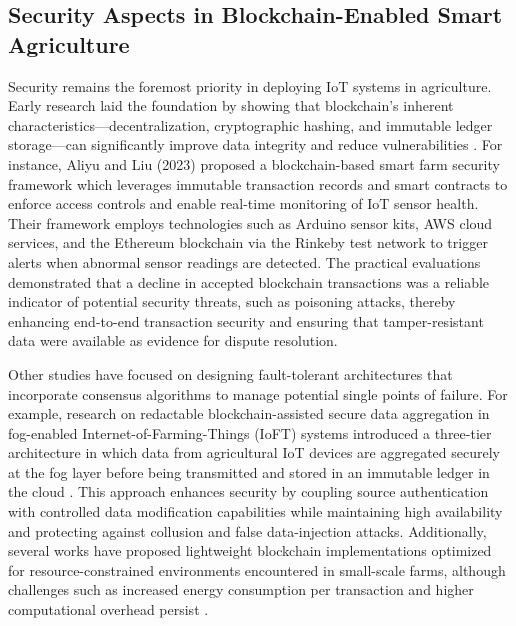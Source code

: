 \documentclass[12pt,onecolumn]{IEEEtran} %
\begin{document}
  \subsection{Security Aspects in Blockchain-Enabled Smart Agriculture}\label{subsec:security}
Security remains the foremost priority in deploying IoT systems in agriculture. Early research laid the foundation by showing that blockchain's inherent characteristics—decentralization, cryptographic hashing, and immutable ledger storage—can significantly improve data integrity and reduce vulnerabilities \cite{aliyu2023blockchainbasedsmartfarm}. For instance, Aliyu and Liu (2023) proposed a blockchain-based smart farm security framework which leverages immutable transaction records and smart contracts to enforce access controls and enable real-time monitoring of IoT sensor health. Their framework employs technologies such as Arduino sensor kits, AWS cloud services, and the Ethereum blockchain via the Rinkeby test network to trigger alerts when abnormal sensor readings are detected. The practical evaluations demonstrated that a decline in accepted blockchain transactions was a reliable indicator of potential security threats, such as poisoning attacks, thereby enhancing end-to-end transaction security and ensuring that tamper-resistant data were available as evidence for dispute resolution.

Other studies have focused on designing fault-tolerant architectures that incorporate consensus algorithms to manage potential single points of failure. For example, research on redactable blockchain-assisted secure data aggregation in fog-enabled Internet-of-Farming-Things (IoFT) systems introduced a three-tier architecture in which data from agricultural IoT devices are aggregated securely at the fog layer before being transmitted and stored in an immutable ledger in the cloud \cite{mishra2023redactableblockchainassistedsecure}. This approach enhances security by coupling source authentication with controlled data modification capabilities while maintaining high availability and protecting against collusion and false data-injection attacks. Additionally, several works have proposed lightweight blockchain implementations optimized for resource-constrained environments encountered in small-scale farms, although challenges such as increased energy consumption per transaction and higher computational overhead persist \cite{shahzad2025decentralizediotbasedarchitectures}.
\end{document}
